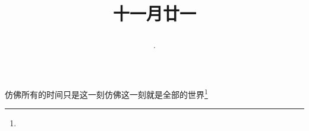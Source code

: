 \title{\date[d=2,m=1,y=2024][year:cn-y,年,month:cn,day:cn,日,·,weekday]·十一月廿一 }
仿佛所有的时间只是这一刻仿佛这一刻就是全部的世界\footnote{ }

